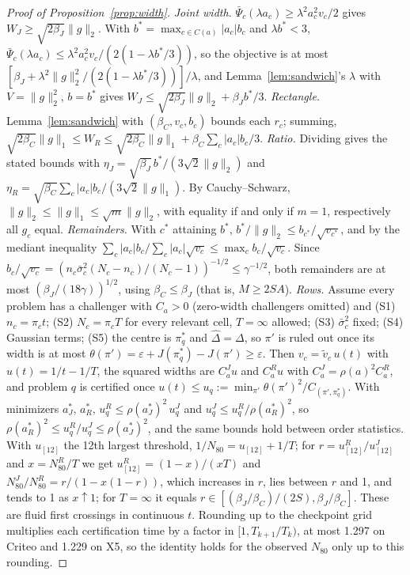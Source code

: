 \documentclass[sigconf,anonymous,review]{acmart}
\newcommand{\eps}{\varepsilon}
\begin{document}
\begin{proof}[Proof of Proposition~\ref{prop:width}]
\emph{Joint width.} $\bar\Psi_c(\lambda a_c) \ge \lambda^2 a_c^2 v_c/2$ gives $W_J \ge \sqrt{2\beta_J}\|g\|_2$. With $b^* = \max_{c\in C(a)}|a_c|b_c$ and $\lambda b^* < 3$, $\bar\Psi_c(\lambda a_c) \le \lambda^2 a_c^2 v_c/(2(1-\lambda b^*/3))$, so the objective is at most $[\beta_J + \lambda^2\|g\|_2^2/(2(1-\lambda b^*/3))]/\lambda$, and Lemma~\ref{lem:sandwich}'s $\lambda$ with $V = \|g\|_2^2$, $b = b^*$ gives $W_J \le \sqrt{2\beta_J}\|g\|_2 + \beta_J b^*/3$.
\emph{Rectangle.} Lemma~\ref{lem:sandwich} with $(\beta_C, v_c, b_c)$ bounds each $r_c$; summing, $\sqrt{2\beta_C}\|g\|_1 \le W_R \le \sqrt{2\beta_C}\|g\|_1 + \beta_C\sum_c |a_c|b_c/3$.
\emph{Ratio.} Dividing gives the stated bounds with $\eta_J = \sqrt{\beta_J}\, b^*/(3\sqrt2\|g\|_2)$ and $\eta_R = \sqrt{\beta_C}\sum_c|a_c|b_c/(3\sqrt2\|g\|_1)$. By Cauchy--Schwarz, $\|g\|_2 \le \|g\|_1 \le \sqrt m\|g\|_2$, with equality if and only if $m = 1$, respectively all $g_c$ equal.
\emph{Remainders.} With $c^*$ attaining $b^*$, $b^*/\|g\|_2 \le b_{c^*}/\sqrt{v_{c^*}}$, and by the mediant inequality $\sum_c|a_c|b_c/\sum_c|a_c|\sqrt{v_c} \le \max_c b_c/\sqrt{v_c}$. Since $b_c/\sqrt{v_c} = (n_c\bar\sigma_c^2(N_c-n_c)/(N_c-1))^{-1/2} \le \gamma^{-1/2}$, both remainders are at most $(\beta_J/(18\gamma))^{1/2}$, using $\beta_C \le \beta_J$ (that is, $M \ge 2SA$).
\emph{Rows.} Assume every problem has a challenger with $C_a > 0$ (zero-width challengers omitted) and (S1) $n_c = \pi_c t$; (S2) $N_c = \pi_c T$ for every relevant cell, $T = \infty$ allowed; (S3) $\bar\sigma_c^2$ fixed; (S4) Gaussian terms; (S5) the centre is $\pi^*_q$ and $\hat\Delta = \Delta$, so $\pi'$ is ruled out once its width is at most $\theta(\pi') = \eps + J(\pi^*_q) - J(\pi') \ge \eps$. Then $v_c = \tilde v_c\, u(t)$ with $u(t) = 1/t - 1/T$, the squared widths are $C^J_a u$ and $C^R_a u$ with $C^J_a = \rho(a)^2 C^R_a$, and problem $q$ is certified once $u(t) \le u_q := \min_{\pi'}\theta(\pi')^2/C_{(\pi',\pi^*_q)}$. With minimizers $a_J^*$, $a_R^*$, $u^R_q \le \rho(a_J^*)^2\, u^J_q$ and $u^J_q \le u^R_q/\rho(a_R^*)^2$, so $\rho(a_R^*)^2 \le u^R_q/u^J_q \le \rho(a_J^*)^2$, and the same bounds hold between order statistics. With $u_{[12]}$ the 12th largest threshold, $1/N_{80} = u_{[12]} + 1/T$; for $r = u^R_{[12]}/u^J_{[12]}$ and $x = N_{80}^R/T$ we get $u^R_{[12]} = (1-x)/(xT)$ and $N_{80}^J/N_{80}^R = r/(1-x(1-r))$, which increases in $r$, lies between $r$ and 1, and tends to 1 as $x \uparrow 1$; for $T = \infty$ it equals $r \in [(\beta_J/\beta_C)/(2S), \beta_J/\beta_C]$. These are fluid first crossings in continuous $t$. Rounding up to the checkpoint grid multiplies each certification time by a factor in $[1, T_{k+1}/T_k)$, at most 1.297 on Criteo and 1.229 on X5, so the identity holds for the observed $N_{80}$ only up to this rounding.
\end{proof}
\end{document}
